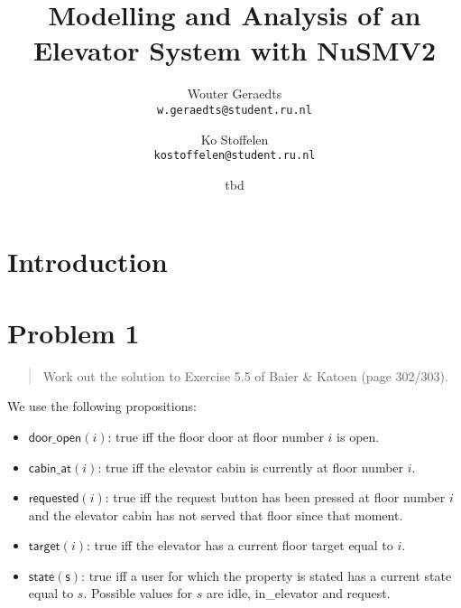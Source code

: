 \documentclass[a4paper,10pt]{article}
\title{Modelling and Analysis of an Elevator System with NuSMV2}
\author{
	Wouter Geraedts \\ \small{\texttt{w.geraedts@student.ru.nl}} \and
	Ko Stoffelen     \\ \small{\texttt{kostoffelen@student.ru.nl}}
}
\date{tbd}
\newcommand{\dooropen}[1]{\mathsf{door\_open}(#1)}
\newcommand{\cabinat}[1]{\mathsf{cabin\_at}(#1)}
\newcommand{\requested}[1]{\mathsf{requested}(#1)}
\newcommand{\target}[1]{\mathsf{target}(#1)}
\newcommand{\state}[1]{\mathsf{state}(\mathsf{#1})}
\begin{document}
	\maketitle


	\section{Introduction}

	
	\section{Problem 1}
	
	\begin{quote}
		Work out the solution to Exercise 5.5 of Baier \& Katoen (page 302/303).
	\end{quote}
	
	We use the following propositions:
	\begin{itemize}
		\item \(\dooropen{i}\): true iff the floor door at floor number \(i\) is open.
		\item \(\cabinat{i}\): true iff the elevator cabin is currently at floor number \(i\).
		\item \(\requested{i}\): true iff the request button has been pressed at floor number \(i\) and the elevator cabin has not served that floor since that moment.
		\item \(\target{i}\): true iff the elevator has a current floor target equal to \(i\).
		\item \(\state{s}\): true iff a user for which the property is stated has a current state equal to \(s\). Possible values for \(s\) are idle, in\_elevator and request.
	\end{itemize}
	
\end{document}
